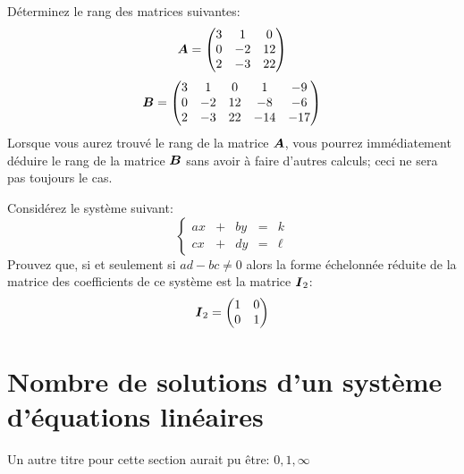 \begin{exerciceC}
	Déterminez le rang des matrices suivantes:
	\[
	\boldsymbol{A} = \begin{pmatrix}
	3 & 1 & 0 \\
	0 & -2 & 12\\
	2 & -3 & 22
	\end{pmatrix}
	\]
	\[
	\boldsymbol{B} = \begin{pmatrix}
	3 & 1 & 0 & 1 & -9\\
	0 & -2 & 12 & -8 & -6\\
	2 & -3 & 22 & -14 & -17
	\end{pmatrix}
	\]
	\suggestion Lorsque vous aurez trouvé le rang de la matrice $\boldsymbol{A}$, vous pourrez immédiatement déduire le rang
	de la matrice $\boldsymbol{B}$ sans avoir à faire d'autres calculs; ceci ne sera pas toujours le cas.
\end{exerciceC}

\begin{exerciceB}\label{ex:2par2}
	Considérez le système suivant:
	\[
	\left\{
	\begin{matrix}
	ax &+& by &=& k \\
	cx &+& dy &=& \ell
	\end{matrix}
	\right.
	\]
	Prouvez que, si et seulement si $ad - bc \ne 0$
	alors la forme échelonnée réduite de la matrice des coefficients de ce système est la matrice $\boldsymbol{I}_2$:
	\[
	\boldsymbol{I}_2 = \begin{pmatrix}
	1 & 0 \\
	0 & 1
	\end{pmatrix}
	\]
\end{exerciceB}

\pagebreak
\section{Nombre de solutions d'un système d'équations linéaires}

Un autre titre pour cette section aurait pu être: $0, 1, \infty$


